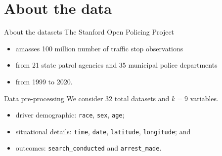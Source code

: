 \documentclass[11pt]{beamer}
\newcommand{\SMR}{\mathrm{SMR}}
\newcommand{\race}{\texttt{race}}
\newcommand{\varr}{\texttt{var}}
\begin{document}

\section{About the data}

\begin{frame}{About the datasets}
	The Stanford Open Policing Project
	\begin{itemize} 
	\item amasses 100 million number of traffic stop observations 
	\item from 21 state patrol agencies and 35 municipal police departments 
	\item from 1999 to 2020. 
	\end{itemize}
\end{frame}

\begin{frame}{Data pre-processing}
	We consider 32 total datasets and $k = 9$ variables. 
	\begin{itemize} 
	\item driver demographic: \texttt{race}, \texttt{sex}, \texttt{age};
	\item situational details: \texttt{time}, \texttt{date}, \texttt{latitude}, \texttt{longitude}; and
	\item outcomes: \texttt{search\_conducted} and \texttt{arrest\_made}.
	\end{itemize}
\end{frame}
\end{document}
